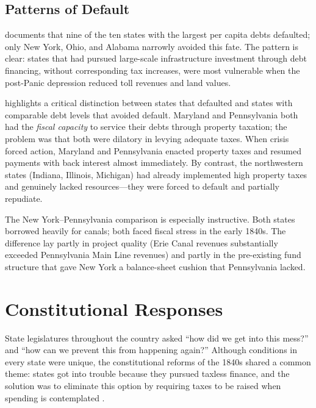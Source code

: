 \documentclass[11pt]{article}
\begin{document}
\subsection{Patterns of Default}

\citet{wallis2005constitutions} documents that nine of the ten states with the
largest per capita debts defaulted; only New York, Ohio, and Alabama narrowly
avoided this fate.  The pattern is clear: states that had pursued large-scale
infrastructure investment through debt financing, without corresponding tax
increases, were most vulnerable when the post-Panic depression reduced toll
revenues and land values.

\citet{wallis2004sovereign} highlights a critical distinction between states
that defaulted and states with comparable debt levels that avoided default.
Maryland and Pennsylvania both had the \emph{fiscal capacity} to service their
debts through property taxation; the problem was that both were dilatory in
levying adequate taxes.  When crisis forced action, Maryland and Pennsylvania
enacted property taxes and resumed payments with back interest almost
immediately.  By contrast, the northwestern states (Indiana, Illinois,
Michigan) had already implemented high property taxes and genuinely lacked
resources---they were forced to default and partially repudiate.

The New York--Pennsylvania comparison is especially instructive.  Both states
borrowed heavily for canals; both faced fiscal stress in the early 1840s.  The
difference lay partly in project quality (Erie Canal revenues substantially
exceeded Pennsylvania Main Line revenues) and partly in the pre-existing fund
structure that gave New York a balance-sheet cushion that Pennsylvania lacked.

\section{Constitutional Responses}
\label{sec:constitution}

State legislatures throughout the country asked ``how did we get into this
mess?'' and ``how can we prevent this from happening again?''  Although
conditions in every state were unique, the constitutional reforms of the 1840s
shared a common theme: states got into trouble because they pursued taxless
finance, and the solution was to eliminate this option by requiring taxes to be
raised when spending is contemplated \citep{wallis2005constitutions}.
\end{document}
